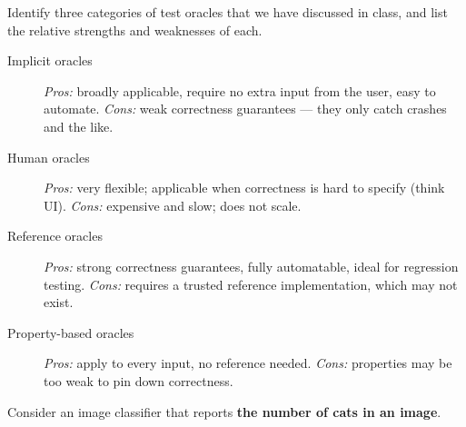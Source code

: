 \documentclass[addpoints, answers]{exam}
\begin{document}
\begin{questions}
\question[3] Identify three categories of test oracles that we have
  discussed in class, and list the relative strengths and weaknesses of
  each.
  \begin{solution} %
    \begin{description}
    \item[Implicit oracles] \emph{Pros:} broadly applicable, require no
      extra input from the user, easy to automate. \emph{Cons:} weak
      correctness guarantees --- they only catch crashes and the like.
    \item[Human oracles] \emph{Pros:} very flexible; applicable when
      correctness is hard to specify (think UI). \emph{Cons:} expensive
      and slow; does not scale.
    \item[Reference oracles] \emph{Pros:} strong correctness
      guarantees, fully automatable, ideal for regression testing.
      \emph{Cons:} requires a trusted reference implementation, which
      may not exist.
    \item[Property-based oracles] \emph{Pros:} apply to every input,
      no reference needed. \emph{Cons:} properties may be too weak to
      pin down correctness.
    \end{description}
  \end{solution}

  \newpage

\question Consider an image classifier that reports \textbf{the number
    of cats in an image}.

\end{questions}
\end{document}
